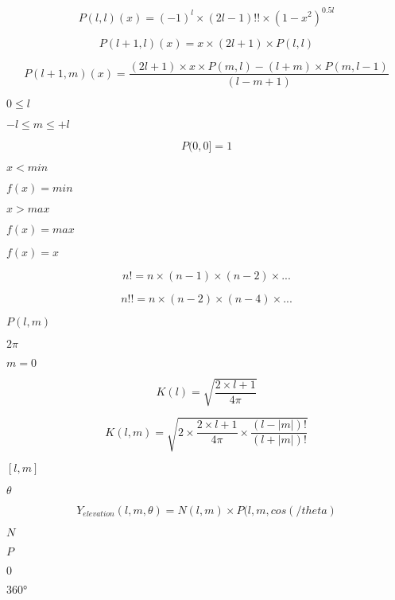 \documentclass{article}
\begin{document}
\[P(l, l)(x) = (-1)^l \times (2l - 1)!! \times (1 - x^2)^{0.5l}\]
\pagebreak

\[P(l + 1, l)(x) = x \times (2l + 1) \times P(l, l)\]
\pagebreak

\[P(l + 1, m)(x) = \frac{(2l + 1) \times x \times P(m, l) - (l + m) \times P(m, l - 1)}{(l - m + 1)}\]
\pagebreak

$0 \leq l$
\pagebreak

$-l \leq m \leq +l$
\pagebreak

\[P(0, 0] = 1\]
\pagebreak

$x < min$
\pagebreak

$f(x) = min$
\pagebreak

$x > max$
\pagebreak

$f(x) = max$
\pagebreak

$f(x) = x$
\pagebreak

\[n! = n \times (n - 1) \times (n - 2) \times {...} \]
\pagebreak

\[n!! = n \times (n - 2) \times (n - 4) \times {...} \]
\pagebreak

$P(l, m)$
\pagebreak

$2\pi$
\pagebreak

$ m = 0$
\pagebreak

\[K(l) = \sqrt{\frac{2 \times l + 1}{4\pi}}\]
\pagebreak

\[K(l, m) = \sqrt{2 \times \frac{2 \times l + 1}{4\pi} \times \frac{(l - |m|)!}{(l + |m|)!}}\]
\pagebreak

$[l, m]$
\pagebreak

$\theta$
\pagebreak

\[Y_{elevation}(l, m, \theta) = N(l, m) \times P(l, m, cos(/theta)\]
\pagebreak

$N$
\pagebreak

$P$
\pagebreak

$0$
\pagebreak

$360°$
\pagebreak
\end{document}
